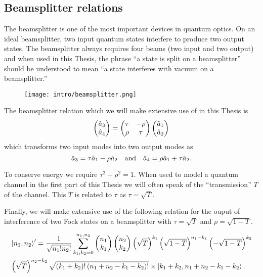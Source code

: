 \FloatBarrier
\subsection{Beamsplitter relations}
The beamsplitter is one of the most important devices in quantum optics. On an ideal beamsplitter, two input quantum states interfere to produce two output states. The beamsplitter always requires four beams (two input and two output) and when used in this Thesis, the phrase ``a state is split on a beamsplitter'' should be understood to mean ``a state interferes with vacuum on a beamsplitter.''


\begin{figure}[htp]
\centering
\captionsetup{width=0.8\linewidth}
\texttt{[image: intro/beamsplitter.png]}
\caption{\label{fig:intro_beamsplitter}}
\end{figure}


The beamsplitter relation which we will make extensive use of in this Thesis is
\begin{equation}
\pmqty{\hat{a}_3 \\ \hat{a}_4} = \pmqty{\tau & -\rho \\  \rho & \tau} \pmqty{\hat{a}_1 \\ \hat{a}_2}
\end{equation}
which transforms two input modes into two output modes as
\begin{equation}
\hat{a}_3 = \tau \hat{a}_1 - \rho \hat{a}_2 \qq{and} \hat{a}_4 = \rho \hat{a}_1 + \tau \hat{a}_2.
\end{equation}

\noindent To conserve energy we require $\tau^2 + \rho^2 = 1$. When used to model a quantum channel in the first part of this Thesis we will often speak of the ``transmission'' $T$ of the channel. This $T$ is related to $\tau$ as $\tau = \sqrt{T}$. 

Finally, we will make extensive use of the following relation for the ouput of interference of two Fock states on a beamsplitter with $\tau = \sqrt{T}$ and $\rho  = \sqrt{1-T}$.

\begin{align}\label{eqn:intro_beamsplitter_fock}
&\ket{n_1, n_2}^\prime  = \frac{1}{\sqrt{n_1! n_2!}} \sum_{k_1, k_2=0}^{n_1, n_2} \pmqty{n_1 \\ k_1} \pmqty{n_2 \\ k_2} \left(\sqrt{T}\right)^{k_1} \left(\sqrt{1-T}\right)^{n_1 - k_1} \left(-\sqrt{1-T}\right)^{k_2} \notag \\
%
&\left(\sqrt{T}\right)^{n_2 - k_2} \sqrt{\left(k_1 + k_2\right)! \left(n_1 + n_2 - k_1 - k_2\right)!} \times \ket{k_1 + k_2, n_1 + n_2 - k_1 - k_2}.
\end{align}



